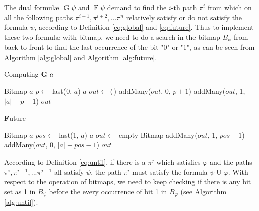 The dual formul\ae{} $\mathop{G}\psi$ and $\mathop{F}\psi$ demand to find the $i$-th path $\pi^i$ from which on all the following paths $\pi^{i + 1}, \pi^{i + 2}, ... \pi^n$ relatively satisfy or do not satisfy the formula $\psi$, according to Definition \eqref{eq:global} and \eqref{eq:future}. Thus to implement these two formul\ae{} with bitmap, we need to do a search in the bitmap $B_{\psi}$ from back to front to find the last occurrence of the bit "0" or "1", as can be seen from Algorithm \ref{alg:global} and Algorithm \ref{alg:future}.

\begin{algorithm}
\caption{Computing $\mathop{\mbox{\textbf{G}}}\, a$}
\label{alg:global}
\begin{algorithmic}[1]
\Require Bitmap $a$
\State $p \gets$ last(0, $a$)
  \State \Return $a$
\Else
  \State $out \gets \langle~\rangle$
  \State addMany($out$, 0, $p + 1$)
  \State addMany($out$, 1, $|a| - p - 1$)
  \State \Return $out$
\EndIf
\end{algorithmic}
\end{algorithm}

\begin{algorithm}
\caption{\textbf{F}uture}
\label{alg:future}
\begin{algorithmic}[1]
\Require Bitmap $a$
\State $pos \gets$ last(1, $a$)
  \State \Return $a$
\Else
  \State $out \gets$ empty Bitmap
  \State addMany($out$, 1, $pos + 1$)
  \State addMany($out$, 0, $|a| - pos - 1$)
  \State \Return $out$
\EndIf
\end{algorithmic}
\end{algorithm}

According to Definition \eqref{eq:until}, if there is a $\pi^j$ which satisfies $\varphi$ and the paths $\pi^i, \pi^{i + 1}, ... \pi^{j - 1}$ all satisfy $\psi$, the path $\pi^i$ must satisfy the formula $\psi \mathrel{U} \varphi$. With respect to the operation of bitmaps, we need to keep checking if there is any bit set as 1 in $B_{\psi}$ before the every occurrence of bit 1 in $B_{\varphi}$ (see Algorithm \ref{alg:until}).

